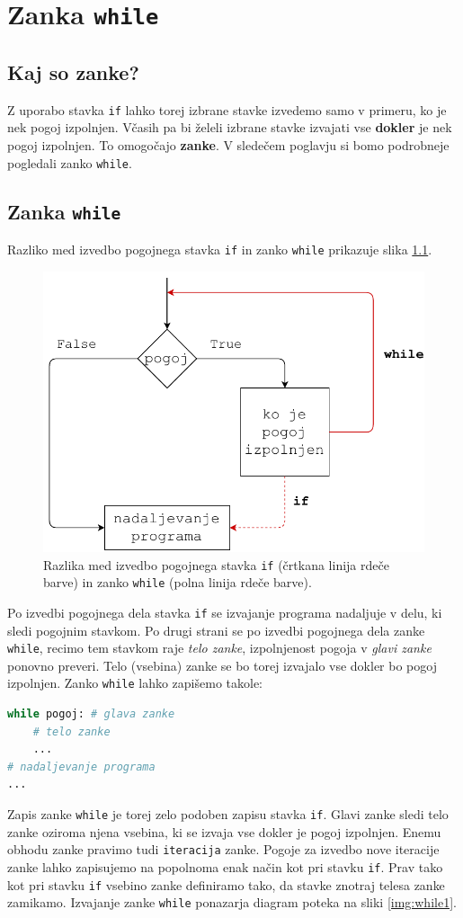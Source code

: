 \chapter{Zanka \texttt{while}}

\section{Kaj so zanke?}

Z uporabo stavka \texttt{if} lahko torej izbrane stavke izvedemo samo v primeru, ko je nek pogoj izpolnjen. Včasih pa bi želeli izbrane stavke izvajati vse \textbf{dokler}  je nek pogoj izpolnjen. To omogočajo \textbf{zanke}. V sledečem poglavju si bomo podrobneje pogledali zanko \texttt{while}. 

\section{Zanka \texttt{while}}

Razliko med izvedbo pogojnega stavka \texttt{if} in zanko \texttt{while} prikazuje slika \ref{img:while_vs_if}.

\begin{figure}
    \centering
    \includegraphics[width=0.5\linewidth]{img/while_vs_if.pdf}
    \caption{Razlika med izvedbo pogojnega stavka \texttt{if} (črtkana linija rdeče barve) in zanko \texttt{while} (polna linija rdeče barve). }
    \label{img:while_vs_if}
\end{figure}
Po izvedbi pogojnega dela stavka \texttt{if} se izvajanje programa nadaljuje v delu, ki sledi pogojnim stavkom. Po drugi strani se po izvedbi pogojnega dela zanke \texttt{while}, recimo tem stavkom raje \emph{telo zanke}, izpolnjenost pogoja v \emph{glavi zanke} ponovno preveri. Telo (vsebina) zanke se bo torej izvajalo vse dokler bo pogoj izpolnjen. Zanko \texttt{while} lahko zapišemo takole:
\begin{lstlisting}[language=Python]
while pogoj: # glava zanke
    # telo zanke
    ...
# nadaljevanje programa
...
\end{lstlisting}
Zapis zanke \texttt{while} je torej zelo podoben zapisu stavka \texttt{if}. Glavi zanke sledi telo zanke oziroma njena vsebina, ki se izvaja vse dokler je pogoj izpolnjen. Enemu obhodu zanke pravimo tudi \texttt{iteracija} zanke. Pogoje za izvedbo nove iteracije zanke lahko zapisujemo na popolnoma enak način kot pri stavku \texttt{if}. Prav tako kot pri stavku \texttt{if} vsebino zanke definiramo tako, da stavke znotraj telesa zanke zamikamo. Izvajanje zanke \texttt{while} ponazarja diagram poteka na sliki \ref{img:while1}.

